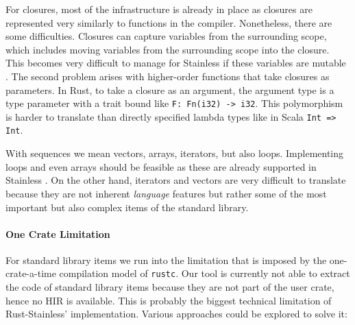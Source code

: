 For closures, most of the infrastructure is already in place as closures
are represented very similarly to functions in the compiler.
Nonetheless, there are some difficulties. Closures can capture variables
from the surrounding scope, which includes moving variables from the
surrounding scope into the closure. This becomes very difficult to
manage for Stainless if these variables are mutable
\cite[section 3.4.3]{regb}. The second problem arises with higher-order
functions that take closures as parameters. In Rust, to take a closure
as an argument, the argument type is a type parameter with a trait bound
like \passthrough{\lstinline!F: Fn(i32) -> i32!}. This polymorphism is
harder to translate than directly specified lambda types like in Scala
\passthrough{\lstinline!Int => Int!}.

With sequences we mean vectors, arrays, iterators, but also loops. Implementing
loops and even arrays should be feasible as these are already supported in
Stainless \cite[section "Imperative"]{stainless-doc}. On the other hand,
iterators and vectors are very difficult to translate because they are not
inherent \emph{language} features but rather some of the most important but also
complex items of the standard library.

\paragraph{One Crate Limitation}

For standard library items we run into the limitation that is imposed by the
one-crate-a-time compilation model of \passthrough{\lstinline!rustc!}. Our tool
is currently not able to extract the code of standard library items because they
are not part of the user crate, hence no HIR is available. This is probably the
biggest technical limitation of Rust-Stainless' implementation. Various
approaches could be explored to solve it:

